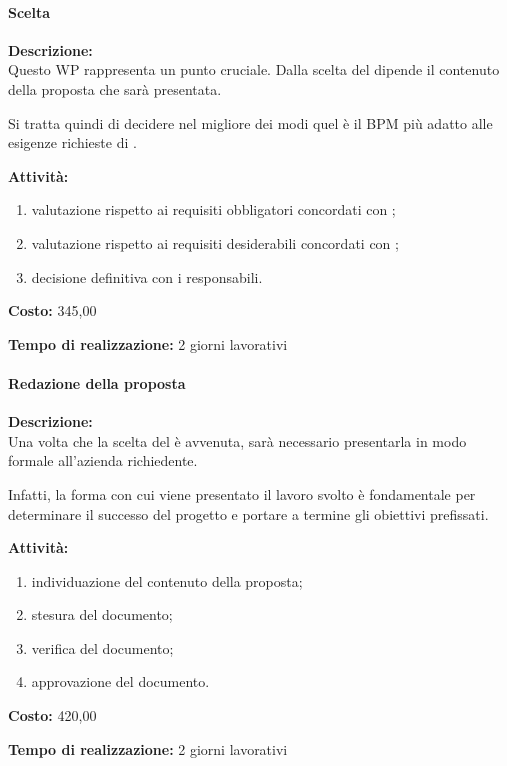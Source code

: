 \paragraph{\bfseries\sffamily{}Scelta \sw}
\begin{description}
\item{\bfseries Descrizione:}\\
Questo WP rappresenta un punto cruciale. Dalla scelta del \sw dipende il contenuto della proposta che sarà presentata.

Si tratta quindi di decidere  nel migliore dei modi quel è il \sw BPM più adatto alle esigenze richieste di \customer.
\item{\bfseries Attività:}
\begin{enumerate}
	\item valutazione rispetto ai requisiti obbligatori concordati con \customer;
	\item valutazione rispetto ai requisiti desiderabili concordati con \customer;
	\item decisione definitiva con i responsabili.
\end{enumerate}
\item{\bfseries Costo:} \text{\euro} 345,00 
\item{\bfseries Tempo di realizzazione:} 2 giorni lavorativi
\end{description}

\paragraph{\bfseries\sffamily{}Redazione della proposta }
\begin{description}
\item{\bfseries Descrizione:}\\
Una volta che la scelta del \sw è avvenuta, sarà necessario presentarla in modo formale all'azienda richiedente.

Infatti, la forma con cui viene presentato il lavoro svolto è fondamentale per determinare il successo del progetto e portare a termine gli obiettivi prefissati.
\item  {\bfseries Attività:}
\begin{enumerate}
	\item individuazione del contenuto della proposta;
	\item stesura del documento;
	\item verifica del documento;
 	\item approvazione del documento.	
\end{enumerate}
\item{\bfseries Costo:} \text{\euro} 420,00 
\item{\bfseries Tempo di realizzazione:} 2 giorni lavorativi
\end{description}

